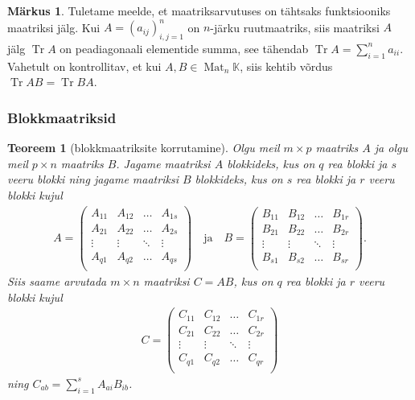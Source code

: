 \documentclass[12pt,a4paper,oneside]{article}
\theoremstyle{plain}
\newtheorem{teoreem}{Teoreem}[section]
\theoremstyle{definition}
\newtheorem{markus}{Märkus}[section]
\numberwithin{equation}{section}
\def\K{{\mathbb K}}
\DeclareMathOperator{\Mat}{Mat}
\DeclareMathOperator{\Tr}{Tr}
\begin{document}
\begin{markus} \label{markus:trace}
Tuletame meelde, et maatriksarvutuses on tähtsaks funktsiooniks  
maatriksi jälg. Kui $A=(a_{ij})_{i,j = 1}^{n}$ on $n$-järku 
ruutmaatriks, siis maatriksi $A$ jälg $\Tr A$ on peadiagonaali 
elementide summa, see tähendab $\Tr A=\sum_{i = 1}^{n} a_{ii}$. 
Vahetult on kontrollitav, et kui $A,B \in \Mat_n \K$, siis kehtib 
võrdus $\Tr AB= \Tr BA$.
\end{markus}

\subsubsection*{Blokkmaatriksid}

\begin{teoreem}[blokkmaatriksite korrutamine]
Olgu meil $m \times p$ maatriks $A$ ja olgu meil $p \times n$ maatriks 
$B$. Jagame maatriksi $A$ blokkideks, kus on $q$ rea blokki ja $s$ 
veeru blokki ning jagame maatriksi $B$ blokkideks, kus on $s$ rea 
blokki ja $r$ veeru blokki kujul
\begin{align*}
A = \begin{pmatrix}
A_{11} & A_{12} & \dots & A_{1s} \\
A_{21} & A_{22} & \dots & A_{2s} \\
\vdots & \vdots & \ddots & \vdots \\
A_{q1} & A_{q2} & \dots & A_{qs} \\
\end{pmatrix} \quad \text{ja} \quad
B = \begin{pmatrix}
B_{11} & B_{12} & \dots & B_{1r} \\
B_{21} & B_{22} & \dots & B_{2r} \\
\vdots & \vdots & \ddots & \vdots \\
B_{s1} & B_{s2} & \dots & B_{sr} \\
\end{pmatrix}.
\end{align*}
Siis saame arvutada $m \times n$ maatriksi $C = AB$, kus on $q$ rea 
blokki ja $r$ veeru blokki kujul
\begin{align*}
C = \begin{pmatrix}
C_{11} & C_{12} & \dots & C_{1r} \\
C_{21} & C_{22} & \dots & C_{2r} \\
\vdots & \vdots & \ddots & \vdots \\
C_{q1} & C_{q2} & \dots & C_{qr} \\
\end{pmatrix}
\end{align*}
ning $C_{ab} = \sum_{i = 1}^{s} A_{ai} B_{ib}$.
\end{teoreem}
\end{document}
